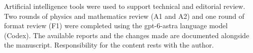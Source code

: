 Artificial intelligence tools were used to support technical and editorial review. Two rounds of physics and mathematics review (A1 and A2) and one round of format review (F1) were completed using the gpt-6-astra language model (Codex). The available reports and the changes made are documented alongside the manuscript. Responsibility for the content rests with the author.
